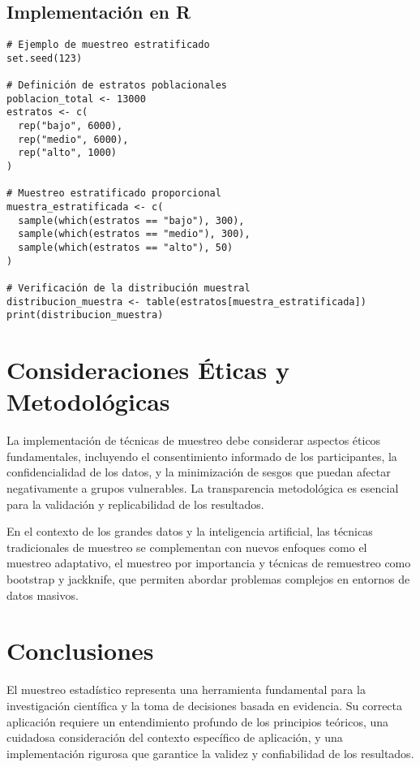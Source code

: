 \subsection{Implementación en R}

\begin{verbatim}
# Ejemplo de muestreo estratificado
set.seed(123)

# Definición de estratos poblacionales
poblacion_total <- 13000
estratos <- c(
  rep("bajo", 6000),
  rep("medio", 6000), 
  rep("alto", 1000)
)

# Muestreo estratificado proporcional
muestra_estratificada <- c(
  sample(which(estratos == "bajo"), 300),
  sample(which(estratos == "medio"), 300),
  sample(which(estratos == "alto"), 50)
)

# Verificación de la distribución muestral
distribucion_muestra <- table(estratos[muestra_estratificada])
print(distribucion_muestra)
\end{verbatim}

\section{Consideraciones Éticas y Metodológicas}

\begin{remark}
La implementación de técnicas de muestreo debe considerar aspectos éticos fundamentales, incluyendo el consentimiento informado de los participantes, la confidencialidad de los datos, y la minimización de sesgos que puedan afectar negativamente a grupos vulnerables. La transparencia metodológica es esencial para la validación y replicabilidad de los resultados.
\end{remark}

\begin{remark}
En el contexto de los grandes datos y la inteligencia artificial, las técnicas tradicionales de muestreo se complementan con nuevos enfoques como el muestreo adaptativo, el muestreo por importancia y técnicas de remuestreo como bootstrap y jackknife, que permiten abordar problemas complejos en entornos de datos masivos.
\end{remark}

\section{Conclusiones}

El muestreo estadístico representa una herramienta fundamental para la investigación científica y la toma de decisiones basada en evidencia. Su correcta aplicación requiere un entendimiento profundo de los principios teóricos, una cuidadosa consideración del contexto específico de aplicación, y una implementación rigurosa que garantice la validez y confiabilidad de los resultados.

